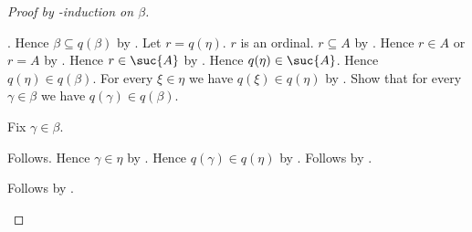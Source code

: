 \begin{proof}[Proof by \in-induction on $\beta$]
\begin{byCase}
\begin{byCase}
                        .
                    Hence $\beta\subseteq q(\beta)$ by
                        .
                    Let $r=q(\eta)$.
                    $r$ is an ordinal.
                    $r\subseteq A$ by
                        .
                    Hence $r\in A$ or $r=A$ by
                        .
                    Hence $r\in\suc{A}$ by .
                    Hence $q(\eta)\in\suc{A}$.
                    Hence $q(\eta)\in q(\beta)$.
                    For every $\xi\in\eta$ we have
                        $q(\xi)\in q(\eta)$ by \auto.
                    Show that for every $\gamma\in\beta$ we have
                        $q(\gamma)\in q(\beta)$.
                    \begin{subproof}
                        Fix $\gamma\in\beta$.
                        \begin{byCase}
                                Follows.
                                Hence $\gamma\in\eta$ by
                                    .
                                Hence $q(\gamma)\in q(\eta)$ by
                                    \auto.
                                Follows by .
                        \end{byCase}
                    \end{subproof}
                    Follows by \auto.
            \end{byCase}
    \end{byCase}
\end{proof}

